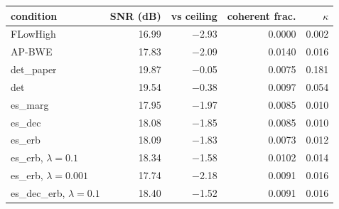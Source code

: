 \begin{tabular}{lrrrr}
\toprule
condition & SNR (dB) & vs ceiling & coherent frac. & $\kappa$ \\
\midrule
FLowHigh & 16.99 & $-$2.93 & 0.0000 & 0.002 \\
AP-BWE & 17.83 & $-$2.09 & 0.0140 & 0.016 \\
det\_paper & 19.87 & $-$0.05 & 0.0075 & 0.181 \\
det & 19.54 & $-$0.38 & 0.0097 & 0.054 \\
es\_marg & 17.95 & $-$1.97 & 0.0085 & 0.010 \\
es\_dec & 18.08 & $-$1.85 & 0.0085 & 0.010 \\
es\_erb & 18.09 & $-$1.83 & 0.0073 & 0.012 \\
es\_erb, $\lambda{=}0.1$ & 18.34 & $-$1.58 & 0.0102 & 0.014 \\
es\_erb, $\lambda{=}0.001$ & 17.74 & $-$2.18 & 0.0091 & 0.016 \\
es\_dec\_erb, $\lambda{=}0.1$ & 18.40 & $-$1.52 & 0.0091 & 0.016 \\
\bottomrule
\end{tabular}
